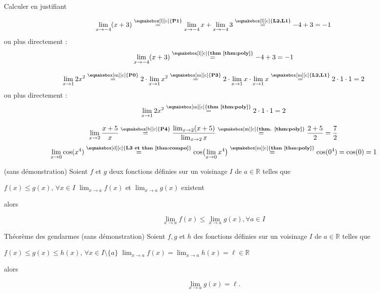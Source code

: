 \documentclass[a4paper,12pt]{article}
\begin{document}
\begin{exemple}
	\tcblower
Calculer en justifiant 
\begin{tasks}
	\task
\[
\lim_{x\to-4}(x+3)
\stackrel{\text{\eqmakebox[l][c]{{\bfseries{P1}}}}}{=}
\lim_{x\to-4}x+\lim_{x\to-4}3
\stackrel{\text{\eqmakebox[l][c]{{\bfseries{L2,L1}}}}}{=}
-4+3=-1
\]
ou plus directement :
\[
\lim_{x\to-4}(x+3)
\stackrel{\text{\eqmakebox[l][c]{{\bfseries{thm \ref{thm:poly}}}}}}{=}
-4+3=-1
\]


\task 

\[
\lim_{x\to1}2x^2
\stackrel{\text{\eqmakebox[m][c]{{\bfseries{P0}}}}}{=}
2\cdot\lim_{x\to1}x^2
\stackrel{\text{\eqmakebox[m][c]{{\bfseries{P3}}}}}{=}
2\cdot\lim_{x\to1}x\cdot\lim_{x\to1}x
\stackrel{\text{\eqmakebox[m][c]{{\bfseries{L2,L1}}}}}{=}
2\cdot1\cdot1=2
\]
ou plus directement :
\[
\lim_{x\to1}2x^2
\stackrel{\text{\eqmakebox[m][c]{{\bfseries{thm \ref{thm:poly}}}}}}{=}
2\cdot1\cdot1=2
\]
\end{tasks}
\end{exemple}
\begin{exemplesuite}
\tcblower
	\begin{tasks}
		\task[c)]
\[
\lim_{x\to2}\dfrac{x+5}{x}
\stackrel{\text{\eqmakebox[b][c]{{\bfseries{P4}}}}}{=}
\dfrac{\lim_{x\to2}(x+5)}{\lim_{x\to2}x}
\stackrel{\text{\eqmakebox[m][c]{{\bfseries thm. \ref{thm:poly}}}}}{=}
\dfrac{2+5}{2}
=\dfrac{7}{2}
\]
\task[d)]
\[
\lim_{x\to0}\cos(x^4)
\stackrel{\text{\eqmakebox[d][c]{{\bfseries{L3 et thm \ref{thm:compo}}}}}}{=}
\cos\bigl(\lim_{x\to0}x^4\bigr)
\stackrel{\text{\eqmakebox[m][c]{{\bfseries thm \ref{thm:poly}}}}}{=}
\cos(0^4)=\cos(0)=1
\]
\end{tasks}
\end{exemplesuite}
\begin{thm}
	(sans démonstration)
	\tcblower
	Soient $f$ et $g$ deux fonctions définies sur un voisinage $I$ de $a\in \mathbb{R}$ telles que  
	\begin{tasks}
		\task $f(x)\leq g(x),\, \forall x \in I$
		\task $\displaystyle{\lim_{x\rightarrow a}f(x)}$ et $\displaystyle{\lim_{x\rightarrow a}g(x)}$ existent  
	\end{tasks} alors 

	\[\displaystyle{\lim_{x\rightarrow a}f(x)}\leq  \displaystyle{\lim_{x\rightarrow a}g(x)}, \forall a\in I\]

\end{thm}
\begin{thm}
	Théorème des gendarmes
	(sans démonstration)
	\tcblower
	Soient $f, g$ et $h$ des fonctions définies sur un voisinage $I$ de $a\in \mathbb{R}$ %
	telles que
	\begin{tasks}
		\task $f(x)\leq g(x)\leq h(x),\, \forall x \in I\setminus\{a\}$
		\task $\displaystyle{\lim_{x\rightarrow a}f(x)}=\displaystyle{\lim_{x\rightarrow a}h(x)}=\ell\in \mathbb{R}$ 

	\end{tasks} alors 

	\[\displaystyle{\lim_{x\rightarrow a}g(x)}=\ell.\]
\end{thm}
\end{document}

